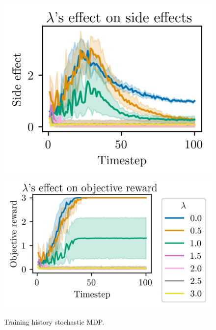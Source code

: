 \documentclass[12pt,A4]{report}
\theoremstyle{definition}
\begin{document}
\begin{appendices}
\begin{figure}[H]
  \centering
  \includegraphics{"./figures/static_8x8_stochastic_side_effects.png"}
  \includegraphics{"./figures/static_8x8_stochastic_objective_reward.png"}
  \caption{Training history stochastic MDP.}
  \label{fig:apendix_results_static_8x8_stochastic}
\end{figure}


\end{appendices}
\end{document}
